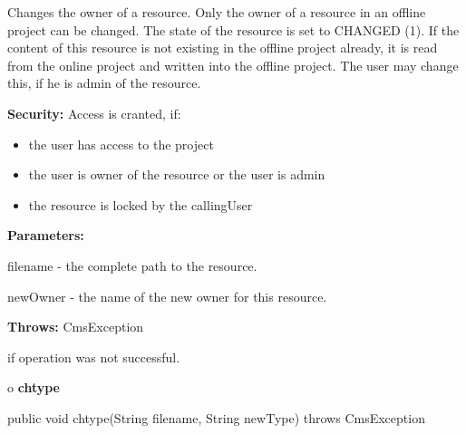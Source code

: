 \begin{description}
\htmlDD Changes the owner of a resource. \htmlBR
Only the owner of a resource in an offline project can be changed. The state
of the resource is set to CHANGED (1). If the content of this resource is not
existing in the offline project already, it is read from the online project
and written into the offline project. The user may change this, if he is admin
of the resource. 

{\bf Security:} Access is cranted, if: 

\begin{itemize}
\item the user has access to the project 
\item the user is owner of the resource or the user is admin 
\item the resource is locked by the callingUser 
\end{itemize}

\begin{description}
\item {\bf Parameters:}  

filename - the complete path to the resource.  

newOwner - the name of the new owner for this resource.  
\item {\bf Throws:} CmsException  

if operation was not successful.  
\end{description}

\end{description}

o {\bf chtype} 

\begin{PRE}
 public void chtype(String filename,
                    String newType) throws CmsException
\end{PRE}

